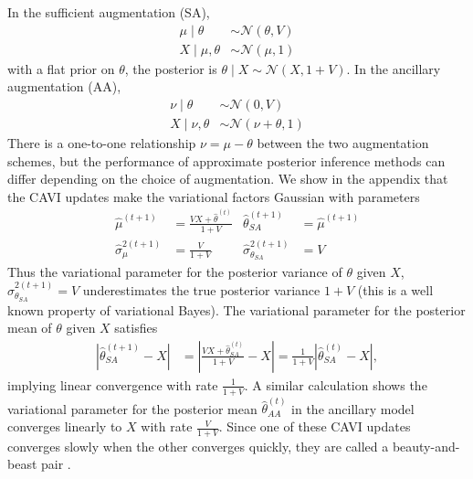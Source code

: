 \documentclass{article}
\begin{document}
In the sufficient augmentation (SA),
\begin{align}
\mu \mid \theta
&\sim \mathcal N(\theta,V) \\
X\mid \mu,\theta
&\sim \mathcal N(\mu,1)
\end{align}
with a flat prior on $\theta$, the posterior is $\theta\mid X\sim\mathcal N(X,1+V)$. In the ancillary augmentation (AA),
\begin{align}
\nu \mid \theta
&\sim \mathcal N(0,V) \\
X\mid \nu,\theta
&\sim \mathcal N(\nu +\theta,1)
\end{align}
There is a one-to-one relationship $\nu=\mu-\theta$ between the two augmentation schemes, but the performance of approximate posterior inference methods can differ depending on the choice of augmentation. We show in the appendix that the CAVI updates make the variational factors Gaussian with parameters 
\begin{align*}
\widehat\mu^{(t+1)}
&= \frac{VX + \widehat\theta^{(t)}}{1+V} 
&
\widehat\theta^{(t+1)}_{SA}
&= \widehat\mu^{(t+1)} \\
\widehat\sigma^{2(t+1)}_{\mu}
&= \frac{V}{1+V} 
&
\widehat\sigma^{2(t+1)}_{\theta_{SA}}
&= V
\end{align*}
Thus the variational parameter for the posterior variance of $\theta$ given $X$, $\widehat\sigma^{2(t+1)}_{\theta_{SA}}= V$ underestimates the true posterior variance $1+V$ (this is a well known property of variational Bayes). The variational parameter for the posterior mean of $\theta$ given $X$ satisfies
\begin{align*}
\left|\widehat\theta^{(t+1)}_{SA} - X\right|
&= \left|\frac{VX + \widehat\theta^{(t)}_{SA}}{1+V} - X\right| 
= \frac{1}{1+V} \left|\widehat\theta^{(t)}_{SA}-X\right|,
\end{align*}
implying linear convergence with rate $\frac{1}{1+V}$. A similar calculation shows the variational parameter for the posterior mean $\widehat\theta^{(t)}_{AA}$ in the ancillary model converges linearly to $X$ with rate $\frac{V}{1+V}$. Since one of these CAVI updates converges slowly when the other converges quickly, they are called a beauty-and-beast pair \cite{Yu}. 
\end{document}
